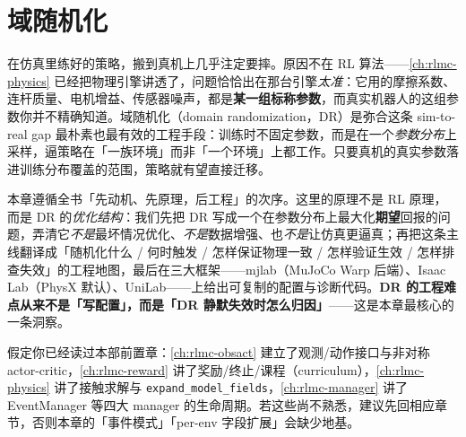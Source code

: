 \chapter{域随机化}\label{ch:rlmc-dr}


在仿真里练好的策略，搬到真机上几乎注定要摔。原因不在 RL 算法——\cref{ch:rlmc-physics} 已经把物理引擎讲透了，问题恰恰出在那台引擎\emph{太准}：它用的摩擦系数、连杆质量、电机增益、传感器噪声，都是\textbf{某一组标称参数}，而真实机器人的这组参数你并不精确知道。域随机化（domain randomization，DR）是弥合这条 sim-to-real gap 最朴素也最有效的工程手段：训练时不固定参数，而是在一个\emph{参数分布}上采样，逼策略在「一族环境」而非「一个环境」上都工作。只要真机的真实参数落进训练分布覆盖的范围，策略就有望直接迁移。

本章遵循全书「先动机、先原理，后工程」的次序。这里的原理不是 RL 原理，而是 DR 的\emph{优化结构}：我们先把 DR 写成一个在参数分布上最大化\textbf{期望}回报的问题，弄清它\emph{不是}最坏情况优化、\emph{不是}数据增强、也\emph{不是}让仿真更逼真；再把这条主线翻译成「随机化什么 / 何时触发 / 怎样保证物理一致 / 怎样验证生效 / 怎样排查失效」的工程地图，最后在三大框架——mjlab（MuJoCo Warp 后端）、Isaac Lab（PhysX 默认）、UniLab——上给出可复制的配置与诊断代码。\textbf{DR 的工程难点从来不是「写配置」，而是「DR 静默失效时怎么归因」}——这是本章最核心的一条洞察。

假定你已经读过本部前置章：\cref{ch:rlmc-obsact} 建立了观测/动作接口与非对称 actor-critic，\cref{ch:rlmc-reward} 讲了奖励/终止/课程（curriculum），\cref{ch:rlmc-physics} 讲了接触求解与 \verb|expand_model_fields|，\cref{ch:rlmc-manager} 讲了 EventManager 等四大 manager 的生命周期。若这些尚不熟悉，建议先回相应章节，否则本章的「事件模式」「per-env 字段扩展」会缺少地基。

